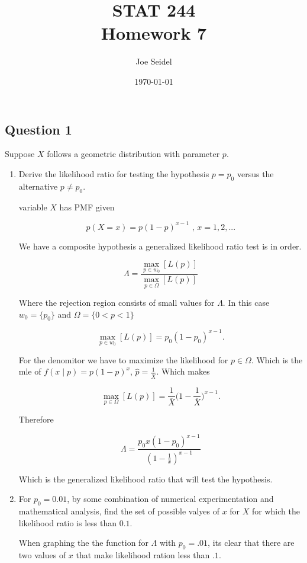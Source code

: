 \documentclass{tufte-book}
\title{STAT 244 \\ Homework 7}
\author{Joe Seidel}
\date{\today}
\theoremstyle{mytheoremstyle}
\theoremstyle{mylemstyle}
\theoremstyle{mydefstyle}
\begin{document}
\maketitle
{}
\newpage
{}

\subsection{Question 1}
Suppose $X$ follows a geometric distribution with parameter $p$.

\begin{enumerate}

\item Derive the likelihood ratio for testing the hypothesis $p=p_0$ versus the alternative $p \neq p_0$.

 variable $X$ has PMF given

\[ p(X=x) = p(1-p)^{x-1} \text{ , } x=1,2,... \]

We have a composite hypothesis a generalized likelihood ratio test is in order.

\[ \Lambda = \frac{\max_{p \in w_0}[L(p)]}{\max_{p \in \Omega}[L(p)]} \]

Where the rejection region consists of small values for $\Lambda$.  In this case $w_0 = \{p_0\}$ and $\Omega = \{ 0 < p < 1\}$

\[ \max_{p \in w_0}[L(p)] = p_0(1-p_0)^{x-1}. \]

For the denomitor we have to maximize the likelihood for $p \in \Omega$.  Which is the mle of $f(x \mid p) = p(1-p)^{x}$, $\hat{p} = \frac{1}{\overline{X}}$. Which makes

\[ \max_{p \in \Omega}[L(p)] = \frac{1}{\overline{X}}\Big(1-\frac{1}{\overline{X}}\Big)^{x-1}. \]

Therefore 

\[ \Lambda = \frac{p_0x(1-p_0)^{x-1}}{(1-\frac{1}{x})^{x-1}} \]

Which is the generalized likelihood ratio that will test the hypothesis.

\item For $p_0=0.01$, by some combination of numerical experimentation and mathematical analysis, find the set of possible valyes of $x$ for $X$ for which the likelihood ratio is less than $0.1$.

When graphing the the function for $\Lambda$ with $p_0=.01$, its clear that there are two values of $x$ that make likelihood ration less than $.1$.


\end{enumerate}
\end{document}
